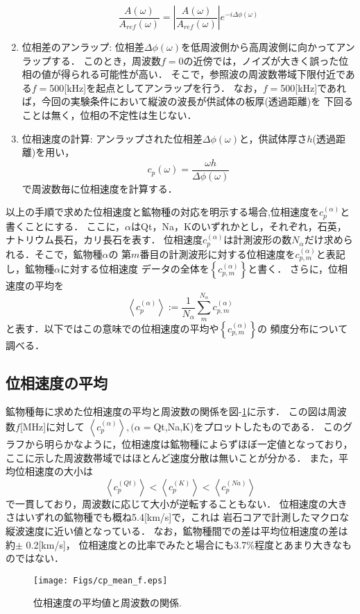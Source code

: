 \begin{enumerate}
\begin{equation}
	\frac{A(\omega)}{A_{ref}(\omega)}
	=
	\left|
	\frac{A(\omega)}{A_{ref}(\omega)}
	\right|
	e^{-i\Delta \phi(\omega)}
	\label{eqn:deconv}
\end{equation}
\item
位相差のアンラップ:
	位相差$\Delta \phi(\omega)$を低周波側から高周波側に向かってアンラップする．
	このとき，周波数$f=0$の近傍では，ノイズが大きく誤った位相の値が得られる可能性が高い．
	そこで，参照波の周波数帯域下限付近である$f=$500[kHz]を起点としてアンラップを行う．
	なお，$f=$500[kHz]であれば，今回の実験条件において縦波の波長が供試体の板厚(透過距離)を
	下回ることは無く，位相の不定性は生じない．
\item
位相速度の計算:
	アンラップされた位相差$\Delta \phi(\omega)$と，供試体厚さ$h$(透過距離)を用い，
	\begin{equation}
		c_p(\omega)=\frac{\omega h}{\Delta \phi(\omega)}
		\label{eqn:cp_phi}
	\end{equation}
	で周波数毎に位相速度を計算する．
\end{enumerate}
以上の手順で求めた位相速度と鉱物種の対応を明示する場合,位相速度を$c_p^{(\alpha)}$と書くことにする．
ここに，$\alpha$はQt，Na，Kのいずれかとし，それぞれ，石英，ナトリウム長石，カリ長石を表す．
位相速度$c_p^{(\alpha)}$は計測波形の数$N_\alpha$だけ求められる．そこで，鉱物種$\alpha$の
第$m$番目の計測波形に対する位相速度を$c_{p,m}^{(\alpha)}$と表記し，鉱物種$\alpha$に対する位相速度
データの全体を$\left\{ c_{p,m}^{(\alpha)}\right\}$と書く．
さらに，位相速度の平均を
\begin{equation}
	\left< c_p^{(\alpha)}\right>:= \frac{1}{N_\alpha}\sum_{m}^{N_\alpha} c_{p,m}^{(\alpha)}
	\label{eqn:}
\end{equation}
と表す．以下ではこの意味での位相速度の平均や$\left\{ c_{p,m}^{(\alpha)}\right\}$の
頻度分布について調べる．
%
%
\subsection{位相速度の平均}
鉱物種毎に求めた位相速度の平均と周波数の関係を図-\ref{fig:fig9}に示す．
この図は周波数$f$[MHz]に対して
$\left< c_p^{(\alpha)}\right>, (\alpha=$Qt,Na,K)をプロットしたものである．
このグラフから明らかなように，位相速度は鉱物種によらずほぼ一定値となっており，
ここに示した周波数帯域ではほとんど速度分散は無いことが分かる．
また，平均位相速度の大小は
\begin{equation}
	\left< c_p^{(Qt)} \right> 
	< 
	\left< c_p^{(K)} \right> 
	< 
	\left< c_p^{(Na)}\right>
	\label{eqn:}
\end{equation}
で一貫しており，周波数に応じて大小が逆転することもない．
位相速度の大きさはいずれの鉱物種でも概ね5.4[km/s]で，これは
岩石コアで計測したマクロな縦波速度に近い値となっている．
なお，鉱物種間での差は平均位相速度の差は約$\pm$ 0.2[km/s]，
位相速度との比率でみたと場合にも3.7$\%$程度とあまり大きなものではない．
\begin{figure}
\begin{center}
	\texttt{[image: Figs/cp\_mean\_f.eps]}
	\caption{位相速度の平均値と周波数の関係.}
	\label{fig:fig9}
\end{center}
	\vspace{-10mm}
\end{figure}
%
%
